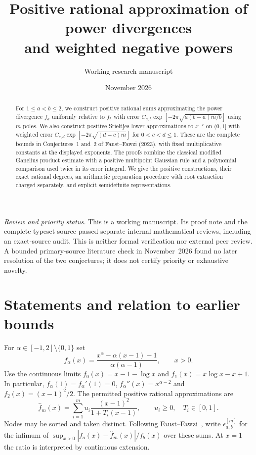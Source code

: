 \documentclass[11pt]{article}
\title{Positive rational approximation of power divergences\texorpdfstring{\\}{ }and weighted negative powers}
\author{Working research manuscript}
\date{November 2026}
\numberwithin{equation}{section}
\begin{document}
\maketitle

\begin{abstract}
For $1\le a<b\le2$, we construct positive rational sums approximating
the power divergence $f_a$ uniformly relative to $f_b$ with error
$C_{a,b}\exp[-2\pi\sqrt{a(b-a)m/b}]$ using $m$ poles. We also construct
positive Stieltjes lower approximations to $x^{-c}$ on $(0,1]$ with
weighted error $C_{c,d}\exp[-2\pi\sqrt{(d-c)m}]$ for $0<c<d\le1$.
These are the complete bounds in Conjectures~1 and~2 of
Faust--Fawzi (2023), with fixed multiplicative constants at the
displayed exponents. The proofs combine the classical modified
Ganelius product estimate with a positive multipoint Gaussian rule
and a polynomial comparison used twice in its error integral.
We give the positive constructions, their exact rational degrees,
an arithmetic preparation procedure with root extraction charged
separately, and explicit semidefinite representations.
\end{abstract}

\noindent\textit{Review and priority status.}
This is a working manuscript. Its proof note and the complete typeset
source passed separate internal mathematical reviews, including an
exact-source audit. This is neither formal verification nor external
peer review. A bounded primary-source
literature check in November~2026 found no later resolution of the two
conjectures; it does not certify priority or exhaustive novelty.

\section{Statements and relation to earlier bounds}

For $\alpha\in[-1,2]\setminus\{0,1\}$ set
\begin{equation}\label{eq:falpha}
 f_\alpha(x)=\frac{x^\alpha-\alpha(x-1)-1}{\alpha(\alpha-1)},
 \qquad x>0.
\end{equation}
Use the continuous limits
$f_0(x)=x-1-\log x$ and $f_1(x)=x\log x-x+1$.
In particular, $f_\alpha(1)=f_\alpha'(1)=0$,
$f_\alpha''(x)=x^{\alpha-2}$ and $f_2(x)=(x-1)^2/2$.
The permitted positive rational approximations are
\begin{equation}\label{eq:allowed}
 \widehat f_m(x)=\sum_{i=1}^m u_i
       \frac{(x-1)^2}{1+T_i(x-1)},\qquad u_i\ge0,\quad T_i\in[0,1].
\end{equation}
Nodes may be sorted and taken distinct. Following
Faust--Fawzi~\cite{FF}, write $\epsilon^{[m]}_{a,b}$ for the infimum of
$\sup_{x>0}|f_a(x)-\widehat f_m(x)|/f_b(x)$ over these sums. At $x=1$
the ratio is interpreted by continuous extension.
\end{document}
